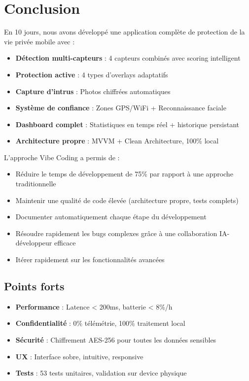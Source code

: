 \documentclass[11pt,a4paper]{article}
\begin{document}
\section{Conclusion}

En 10 jours, nous avons développé une application complète de protection de la vie privée mobile avec :

\begin{itemize}
    \item \textbf{Détection multi-capteurs} : 4 capteurs combinés avec scoring intelligent
    \item \textbf{Protection active} : 4 types d'overlays adaptatifs
    \item \textbf{Capture d'intrus} : Photos chiffrées automatiques
    \item \textbf{Système de confiance} : Zones GPS/WiFi + Reconnaissance faciale
    \item \textbf{Dashboard complet} : Statistiques en temps réel + historique persistant
    \item \textbf{Architecture propre} : MVVM + Clean Architecture, 100\% local
\end{itemize}

L'approche Vibe Coding a permis de :
\begin{itemize}
    \item Réduire le temps de développement de 75\% par rapport à une approche traditionnelle
    \item Maintenir une qualité de code élevée (architecture propre, tests complets)
    \item Documenter automatiquement chaque étape du développement
    \item Résoudre rapidement les bugs complexes grâce à une collaboration IA-développeur efficace
    \item Itérer rapidement sur les fonctionnalités avancées
\end{itemize}

\subsection{Points forts}
\begin{itemize}
    \item \textbf{Performance} : Latence < 200ms, batterie < 8\%/h
    \item \textbf{Confidentialité} : 0\% télémétrie, 100\% traitement local
    \item \textbf{Sécurité} : Chiffrement AES-256 pour toutes les données sensibles
    \item \textbf{UX} : Interface sobre, intuitive, responsive
    \item \textbf{Tests} : 53 tests unitaires, validation sur device physique
\end{itemize}
\end{document}
